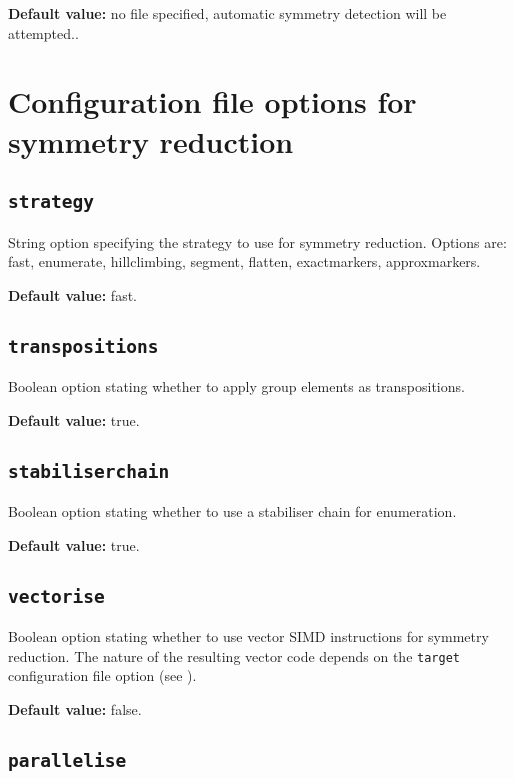 \noindent\textbf{Default value: } no file specified, automatic symmetry detection will be attempted..

\section{Configuration file options for symmetry reduction}\label{sec:overview:symmetryreductionconfig}

\subsection{\texttt{strategy}}

String option specifying the strategy to use for symmetry reduction.  Options are: fast, enumerate, hillclimbing, segment, flatten, exactmarkers, approxmarkers.

\noindent\textbf{Default value: } fast.

\subsection{\texttt{transpositions}}

Boolean option stating whether to apply group elements as transpositions.

\noindent\textbf{Default value: } true.

\subsection{\texttt{stabiliserchain}}

Boolean option stating whether to use a stabiliser chain for enumeration.

\noindent\textbf{Default value: } true.

\subsection{\texttt{vectorise}}

Boolean option stating whether to use vector SIMD instructions for symmetry reduction.  The nature of the resulting
vector code depends on the \texttt{target} configuration file option (see ).

\noindent\textbf{Default value: } false.

\subsection{\texttt{parallelise}}

